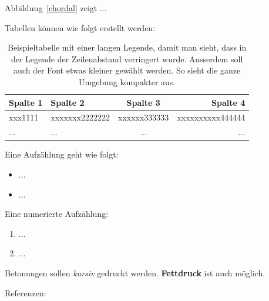Abbildung~\ref{chordal} zeigt ...

Tabellen k\"onnen wie folgt erstellt werden:

{
\renewcommand{\baselinestretch}{0.9} 
\normalsize
\begin{table}[htb]
\begin{tabular}{|p{2.7cm}||l|c|r|}
\hline
    \textbf{Spalte 1} 
  & \textbf{Spalte 2} 
  & \textbf{Spalte 3} 
  & \textbf{Spalte 4} \\
  \hline\hline
  xxx1111
  & xxxxxxx2222222
  & xxxxxx333333 
  & xxxxxxxxxx444444 \\
  \hline
    ...
  & ...
  & ...
  & ...\\
  \hline
\end{tabular}
  \caption[Diese Kurzcaption ist fuer das Tabellenverzeichnis]{Beispieltabelle mit einer langen Legende, damit man sieht, dass in der Legende der Zeilenabstand verringert wurde. Ausserdem soll auch der Font etwas kleiner gew\"ahlt werden. So sieht die ganze Umgebung kompakter aus.}
  \label{tabelle-1}
\end{table}
}

\noindent
Eine Aufz\"ahlung geht wie folgt:
\begin{itemize}
\item ...
\item ...
\end{itemize}
Eine numerierte Aufz\"ahlung:
\begin{enumerate}
\item ...
\item ...
\end{enumerate}

Betonungen sollen \emph{kursiv} gedruckt werden. 
\textbf{Fettdruck} ist auch m\"oglich.

Referenzen: \cite{SaaSchTue97,TueConSaa96ismis,SchTueSaa98preprint}
